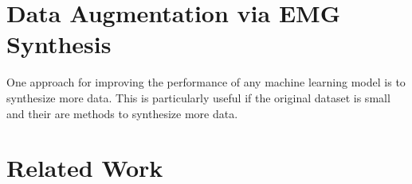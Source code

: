 \section{Data Augmentation via EMG Synthesis}

One approach for improving the performance of any machine learning model
is to synthesize more data. This is particularly useful if the original
dataset is small and their are methods to synthesize more data.

\section{Related Work}